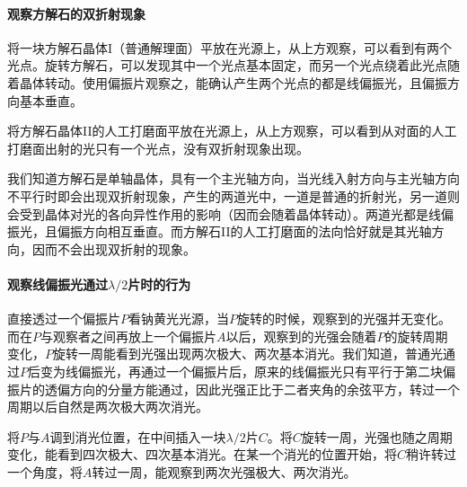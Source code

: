 \documentclass[UTF8]{ctexart}
\begin{document}
\paragraph{观察方解石的双折射现象}
将一块方解石晶体I（普通解理面）平放在光源上，从上方观察，可以看到有两个光点。旋转方解石，可以发现其中一个光点基本固定，而另一个光点绕着此光点随着晶体转动。使用偏振片观察之，能确认产生两个光点的都是线偏振光，且偏振方向基本垂直。

将方解石晶体II的人工打磨面平放在光源上，从上方观察，可以看到从对面的人工打磨面出射的光只有一个光点，没有双折射现象出现。

我们知道方解石是单轴晶体，具有一个主光轴方向，当光线入射方向与主光轴方向不平行时即会出现双折射现象，产生的两道光中，一道是普通的折射光，另一道则会受到晶体对光的各向异性作用的影响（因而会随着晶体转动）。两道光都是线偏振光，且偏振方向相互垂直。而方解石II的人工打磨面的法向恰好就是其光轴方向，因而不会出现双折射的现象。
\paragraph{观察线偏振光通过$\lambda/2$片时的行为}
直接透过一个偏振片$P$看钠黄光光源，当$P$旋转的时候，观察到的光强并无变化。而在$P$与观察者之间再放上一个偏振片$A$以后，观察到的光强会随着$P$的旋转周期变化，$P$旋转一周能看到光强出现两次极大、两次基本消光。我们知道，普通光通过$P$后变为线偏振光，再通过一个偏振片后，原来的线偏振光只有平行于第二块偏振片的透偏方向的分量方能通过，因此光强正比于二者夹角的余弦平方，转过一个周期以后自然是两次极大两次消光。

将$P$与$A$调到消光位置，在中间插入一块$\lambda/2$片$C$。将$C$旋转一周，光强也随之周期变化，能看到四次极大、四次基本消光。在某一个消光的位置开始，将$C$稍许转过一个角度，将$A$转过一周，能观察到两次光强极大、两次消光。
\end{document}
